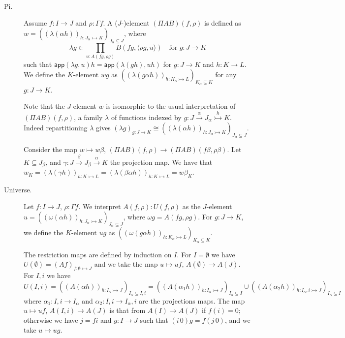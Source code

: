 \documentclass[english]{PaperTools/latex/lipics}
\def\ie{\textit{i.e.}}
\def\app#1#2{\mathsf{app}(#1,#2)}
\begin{document}
\bigskip
\begin{description}
  \item[\sc Pi.]
    Assume $f : I → J$ and $ρ : Γf$.
    A ($J$-)element $(Π A B)(f,ρ)$ is defined as
    $w = \left(\left(λ(αh)\right)_{h : J_α ↣ K}\right)_{J_α ⊆ J}$,
    where
    $$λ g ∈ \prod_{u : A(fg,ρg)} B(fg,⟨ρg,u⟩) \quad\text{for $g : J → K$}$$
    such that
    $\app{λg} u h = \app{λ(gh)}{uh}$ for $g : J → K$ and $h : K → L$.
    We define the $K$-element $w g$ as
    $\left(\left(λ(gαh)\right)_{h : K_α ↣ L}\right)_{K_α ⊆ K}$ for any $g : J → K$.

    Note that the $J$-element $w$ is isomorphic to the usual interpretation
    of $(ΠAB)(f,ρ)$, a family $λ$ of functions indexed by
    $g : J \stackrel{α}{→} J_α \stackrel {h}{↣} K$.  Indeed repartitioning $λ$ gives
    $\left(λg\right)_{g : J → K} ≅ \left(\left(λ(αh)\right)_{h : J_α ↣ K}\right)_{J_α ⊆ J}$.

    Consider the map $w ↦ wβ$, $(Π A B)(f,ρ) → (Π A B)(fβ,ρβ)$.  Let
    $K ⊆ J_β$, and $γ : J \stackrel{β}{→} J_β \stackrel{α}{→} K$ the projection map.
    We have that
    $w_K = \left(λ(γh)\right)_{h : K ↣ L}
         = \left(λ(βαh)\right)_{h : K ↣ L}
         = wβ_K$.


  \item[\sc Universe.]
    Let $f : I → J$, $ρ : Γf$.  We interpret $A(f,ρ) : U(f,ρ)$ as the
    $J$-element $u = \left(\left(ω(αh)\right)_{h : J_α ↣ K}\right)_{J_α ⊆ J}$,
    where $ωg = A(fg,ρg)$.
    For $g : J → K$, we define the $K$-element $u g$ as
    $\left(\left(ω(gαh)\right)_{h : K_α ↣ L}\right)_{K_α ⊆ K}$.

    The restriction maps are defined by induction on $I$.
    For $I = ∅$ we have $U(∅) = (Af)_{f:∅ ↣ J}$ and we take the map
    $u ↦ uf$, $A(∅) → A(J)$.
    For $I,i$ we have $U(I,i) = \left(\left(A(αh)\right)_{h : I_α ↣ J}\right)_{I_α ⊆ I,i}
    = \left(\left(A(α_1h)\right)_{h : I_α ↣ J}\right)_{I_α ⊆ I} ∪
      \left(\left(A(α_2h)\right)_{h : I_α,i ↣ J}\right)_{I_α ⊆ I}$
    where $α_1 : I,i → I_α$ and $α_2 : I,i → I_α,i$ are the projections
    maps.
    The map $u ↦ uf$, $A(I,i) → A(J)$ is
    that from $A(I) → A(J)$ if $f(i) = 0$; otherwise
    we have $j = fi$ and $g : I→J$ such that $(i\,0)g = f(j\,0)$, and we
    take $u ↦ ug$.


\end{description}
\end{document}
